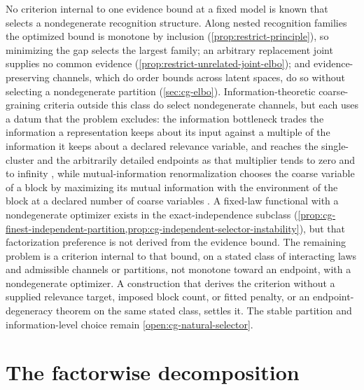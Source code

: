 No criterion internal to one evidence bound at a fixed model is known that
selects a nondegenerate recognition structure. Along nested recognition
families the optimized bound is monotone by inclusion
(\cref{prop:restrict-principle}), so minimizing the gap selects the largest
family; an arbitrary replacement joint supplies no common evidence
(\cref{prop:restrict-unrelated-joint-elbo}); and evidence-preserving channels,
which do order bounds across latent spaces, do so without selecting a
nondegenerate partition (\cref{sec:cg-elbo}). Information-theoretic
coarse-graining criteria outside this class do select nondegenerate channels, but
each uses a datum that the problem excludes: the information bottleneck trades the
information a representation keeps about its input against a multiple of the
information it keeps about a declared relevance variable, and reaches the
single-cluster and the arbitrarily detailed endpoints as that multiplier tends to
zero and to infinity \citep{tishby1999information}, while mutual-information
renormalization chooses the coarse variable of a block by maximizing its mutual
information with the environment of the block at a declared number of coarse
variables \citep{KochJanuszRingel2018}. A fixed-law functional with a
nondegenerate optimizer exists in the exact-independence subclass
(\cref{prop:cg-finest-independent-partition,prop:cg-independent-selector-instability}),
but that factorization preference is not derived from the evidence bound.
The remaining problem is a criterion internal to that bound, on a stated
class of interacting laws and admissible channels or partitions, not
monotone toward an endpoint, with a nondegenerate optimizer. A construction
that derives the criterion without a supplied relevance target, imposed
block count, or fitted penalty, or an endpoint-degeneracy theorem on the
same stated class, settles it. The stable partition and information-level
choice remain \cref{open:cg-natural-selector}.

\section{The factorwise decomposition}
\label{sec:elbo-factorization}

